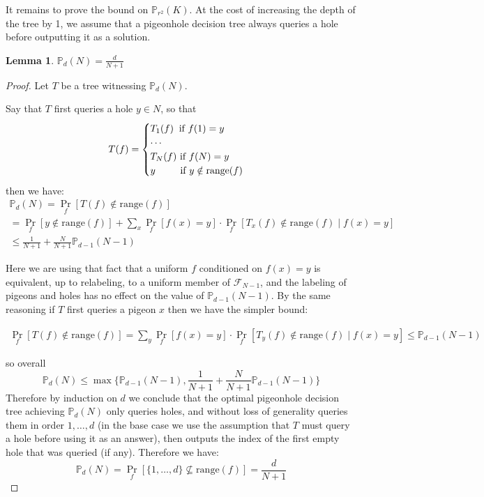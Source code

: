 \documentclass[11pt]{article}
\newtheorem{lemma}{Lemma}
\newcommand{\rng}{\mathrm{range}}
\begin{document}
It remains to prove the bound on $\mathbb{P}_{r^2}(K)$. At the cost of increasing the depth of the tree by 1, we assume that a pigeonhole decision tree always queries a hole before outputting it as a solution.

\begin{lemma}\label{lem:pdt-lb}
$\mathbb{P}_d(N) = \frac{d}{N+1}$
\end{lemma}
\begin{proof}
Let $T$ be a tree witnessing $\mathbb{P}_d(N)$. 

Say that $T$ first queries a hole $y \in N$, so that 
\[
T(f) = \begin{cases}
T_1(f) \text{\;\;if } f(1) = y\\
\cdots \\
T_{N}(f) \text{ if } f(N) = y\\
y \text{\;\;\;\;\;\;\;\; if } y \notin \rng(f)
\end{cases}
\]
then we have:
\begin{gather*}
\mathbb{P}_d(N) = \Pr_{f}[T(f) \notin \rng(f)] \\
= \Pr_f[y \notin \rng(f)] + \sum\limits_{x}\Pr_f[f(x)=y] \cdot \Pr_f[T_x(f) \notin \rng(f) \mid f(x)=y] \\
\leq \frac{1}{N+1} + \frac{N}{N+1} \mathbb{P}_{d-1}(N-1)
\end{gather*}

Here we are using that fact that a uniform $f$ conditioned on $f(x)=y$ is equivalent, up to relabeling, to a uniform member of $\mathcal{F}_{N-1}$, and the labeling of pigeons and holes has no effect on the value of $\mathbb{P}_{d-1}(N-1)$. By the same reasoning if $T$ first queries a pigeon $x$ then we have the simpler bound:

\begin{gather*}
\Pr_{f}[T(f) \notin \rng(f)] = \sum\limits_{y} \Pr_f[f(x)=y] \cdot \Pr_f[T_y(f) \notin \rng(f) \mid f(x)=y]
\leq  \mathbb{P}_{d-1}(N-1)
\end{gather*}

so overall
\[
\mathbb{P}_d(N) \leq \max\{\mathbb{P}_{d-1}(N-1),\frac{1}{N+1} + \frac{N}{N+1} \mathbb{P}_{d-1}(N-1)\}
\]
Therefore by induction on $d$ we conclude that the optimal pigeonhole decision tree achieving $\mathbb{P}_d(N)$ only queries holes, and without loss of generality queries them in order $1,\ldots, d$ (in the base case we use the assumption that $T$ must query a hole before using it as an answer), then outputs the index of the first empty hole that was queried (if any). Therefore we have:
\[
\mathbb{P}_d(N) = \Pr_f[\{1,\ldots,d\} \nsubseteq \rng(f)] = \frac{d}{N+1}
\]
\end{proof}
\end{document}

